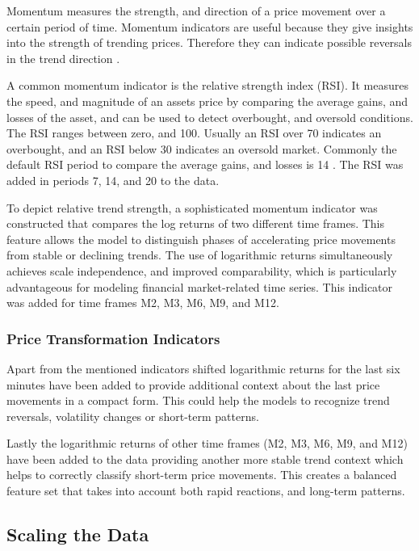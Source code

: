Momentum measures the strength, and direction of a price movement over a certain period of time.
Momentum indicators are useful because they give insights into the strength of trending prices.
Therefore they can indicate possible reversals in the trend direction \cite{investopia-momentum}.

A common momentum indicator is the relative strength index (RSI).
It measures the speed, and magnitude of an assets price by comparing the average gains, and losses of the asset, and can be used to detect overbought, and oversold conditions.
The RSI ranges between zero, and 100.
Usually an RSI over 70 indicates an overbought, and an RSI below 30 indicates an oversold market.
Commonly the default RSI period to compare the average gains, and losses is 14 \cite{investopia-rsi}.
The RSI was added in periods 7, 14, and 20 to the data.

To depict relative trend strength, a sophisticated momentum indicator was constructed that compares the log returns of two different time frames.
This feature allows the model to distinguish phases of accelerating price movements from stable or declining trends.
The use of logarithmic returns simultaneously achieves scale independence, and improved comparability, which is particularly advantageous for modeling financial market-related time series.
This indicator was added for time frames M2, M3, M6, M9, and M12.

\subsubsection{Price Transformation Indicators}

Apart from the mentioned indicators shifted logarithmic returns for the last six minutes have been added to provide additional context about the last price movements in a compact form.
This could help the models to recognize trend reversals, volatility changes or short-term patterns.

Lastly the logarithmic returns of other time frames (M2, M3, M6, M9, and M12) have been added to the data providing another more stable trend context which helps to correctly classify short-term price movements.
This creates a balanced feature set that takes into account both rapid reactions, and long-term patterns.

\subsection{Scaling the Data}

